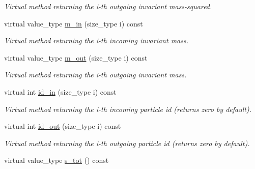 \begin{DoxyCompactItemize}
\begin{DoxyCompactList}\small\item\em Virtual method returning the i-\/th outgoing invariant mass-\/squared. \end{DoxyCompactList}\item 
\hypertarget{a00442_a422a6b7a79690e7bae81713bd8eb3b15}{virtual value\-\_\-type \hyperlink{a00442_a422a6b7a79690e7bae81713bd8eb3b15}{m\-\_\-in} (size\-\_\-type i) const }\label{a00442_a422a6b7a79690e7bae81713bd8eb3b15}

\begin{DoxyCompactList}\small\item\em Virtual method returning the i-\/th incoming invariant mass. \end{DoxyCompactList}\item 
\hypertarget{a00442_a72ab870e1cdff092a9102b346783f268}{virtual value\-\_\-type \hyperlink{a00442_a72ab870e1cdff092a9102b346783f268}{m\-\_\-out} (size\-\_\-type i) const }\label{a00442_a72ab870e1cdff092a9102b346783f268}

\begin{DoxyCompactList}\small\item\em Virtual method returning the i-\/th outgoing invariant mass. \end{DoxyCompactList}\item 
virtual int \hyperlink{a00442_a93226df13fcf52eb52b5b8d894885462}{id\-\_\-in} (size\-\_\-type i) const 
\begin{DoxyCompactList}\small\item\em Virtual method returning the i-\/th incoming particle id (returns zero by default). \end{DoxyCompactList}\item 
virtual int \hyperlink{a00442_a30cad3b16698c3d0d47d01b0a2d61df2}{id\-\_\-out} (size\-\_\-type i) const 
\begin{DoxyCompactList}\small\item\em Virtual method returning the i-\/th outgoing particle id (returns zero by default). \end{DoxyCompactList}\item 
\hypertarget{a00442_a23b8eb4a43103ad601f6e46c6f6c6736}{virtual value\-\_\-type \hyperlink{a00442_a23b8eb4a43103ad601f6e46c6f6c6736}{s\-\_\-tot} () const }\label{a00442_a23b8eb4a43103ad601f6e46c6f6c6736}


\end{DoxyCompactItemize}
